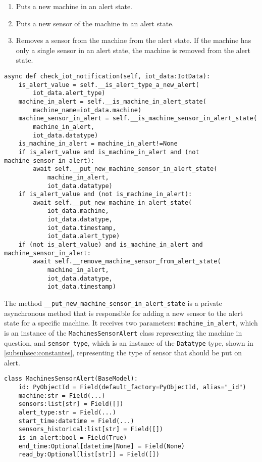 \begin{enumerate}
    \item Puts a new machine in an alert state.
    \item Puts a new sensor of the machine in an alert state.
    \item Removes a sensor from the machine from the alert state. If the machine has only a single sensor in an alert state, the machine is removed from the alert state.
\end{enumerate}

\begin{Verbatim}[fontsize=\small, baselinestretch=0.8]
async def check_iot_notification(self, iot_data:IotData):
    is_alert_value = self.__is_alert_type_a_new_alert(
        iot_data.alert_type)
    machine_in_alert = self.__is_machine_in_alert_state(
        machine_name=iot_data.machine)
    machine_sensor_in_alert = self.__is_machine_sensor_in_alert_state(
        machine_in_alert,
        iot_data.datatype)
    is_machine_in_alert = machine_in_alert!=None
    if is_alert_value and is_machine_in_alert and (not machine_sensor_in_alert):
        await self.__put_new_machine_sensor_in_alert_state(
            machine_in_alert,
            iot_data.datatype)
    if is_alert_value and (not is_machine_in_alert):
        await self.__put_new_machine_in_alert_state(
            iot_data.machine,
            iot_data.datatype,
            iot_data.timestamp,
            iot_data.alert_type)
    if (not is_alert_value) and is_machine_in_alert and machine_sensor_in_alert:
        await self.__remove_machine_sensor_from_alert_state(
            machine_in_alert,
            iot_data.datatype,
            iot_data.timestamp)
\end{Verbatim}

The method \texttt{\_\_put\_new\_machine\_sensor\_in\_alert\_state} is a private asynchronous method that is responsible for adding a new sensor to the alert state for a specific machine. It receives two parameters: \texttt{machine\_in\_alert}, which is an instance of the \texttt{MachinesSensorAlert} class representing the machine in question, and \texttt{sensor\_type}, which is an instance of the \texttt{Datatype} type, shown in \ref{subsubsec:constantes}, representing the type of sensor that should be put on alert.

\begin{Verbatim}[fontsize=\small, baselinestretch=0.8]
class MachinesSensorAlert(BaseModel):
    id: PyObjectId = Field(default_factory=PyObjectId, alias="_id")
    machine:str = Field(...)
    sensors:list[str] = Field([])
    alert_type:str = Field(...)
    start_time:datetime = Field(...)
    sensors_historical:list[str] = Field([])
    is_in_alert:bool = Field(True)
    end_time:Optional[datetime|None] = Field(None)
    read_by:Optional[list[str]] = Field([])
\end{Verbatim}

